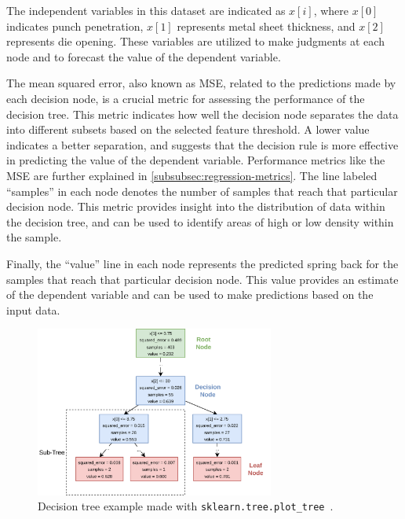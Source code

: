 The independent variables in this dataset are indicated as $x[i]$, where $x[0]$ indicates punch penetration, $x[1]$
represents metal sheet thickness, and $x[2]$ represents die opening.
These variables are utilized to make judgments at each node and to forecast the value of the dependent variable.

The mean squared error, also known as MSE, related to the predictions made by each decision node, is a crucial metric
for assessing the performance of the decision tree.
This metric indicates how well the decision node separates the data into different subsets based on the selected
feature threshold.
A lower value indicates a better separation, and suggests that the decision rule is more effective in predicting the
value of the dependent variable.
Performance metrics like the \ac{MSE} are further explained in \ref{subsubsec:regression-metrics}.
The line labeled ``samples'' in each node denotes the number of samples that reach that particular decision node.
This metric provides insight into the distribution of data within the decision tree, and can be used to identify
areas of high or low density within the sample.

Finally, the ``value'' line in each node represents the predicted spring back for the samples that reach that
particular decision node.
This value provides an estimate of the dependent variable and can be used to make predictions based on the input data.

\begin{figure}[]
    \begin{tcolorbox}[arc=0pt,boxrule=0.5pt]
        \centering
        \includegraphics[width=0.7\textwidth]{chap4/images/decision_tree_example}
    \end{tcolorbox}
    \caption{Decision tree example made with \texttt{sklearn.tree.plot\_tree}~\cite{scikit-learn}.
    }
    \label{fig:dt-example}
\end{figure}


